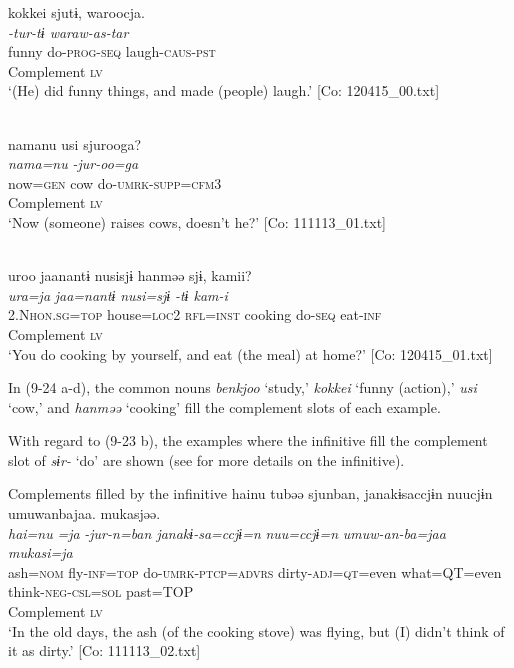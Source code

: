 \ex %
\gllll   {\textbar}kokkei{\textbar}  sjutɨ,  waroocja.\\
      \textit{}  \textit{-tur-tɨ  waraw-as-tar}\\
      funny  do-\textsc{prog}-\textsc{seq}  laugh-\textsc{caus}-\textsc{pst}\\
      Complement  \textsc{lv}  \\
      \glt       ‘(He) did funny things, and made (people) laugh.’ [Co: 120415\_00.txt]

\ex\relax  [= (8-61 a)]\\
    \gllll  namanu  usi  sjurooga?\\
      \textit{nama=nu}  \textit{}  \textit{-jur-oo=ga}\\
      now=\textsc{gen}  cow  do-\textsc{umrk}-\textsc{supp}=\textsc{cfm}3\\
        Complement  \textsc{lv}\\
      \glt       ‘Now (someone) raises cows, doesn’t he?’ [Co: 111113\_01.txt]

\ex\relax [= (6-65 b)]\\
    \gllll  uroo  jaanantɨ  nusisjɨ  hanməə  sjɨ,  kamii?\\
      \textit{ura=ja}  \textit{jaa=nantɨ}  \textit{nusi=sjɨ}  \textit{}  \textit{-tɨ  kam-i}\\
      2.N\textsc{hon}.\textsc{sg}=\textsc{top}  house=\textsc{loc}2  \textsc{rfl}=\textsc{inst}  cooking  do-\textsc{seq}  eat-\textsc{inf}\\
            Complement  \textsc{lv}  \\
      \glt       ‘You do cooking by yourself, and eat (the meal) at home?’ [Co: 120415\_01.txt]
    \z
\z

In (9-24 a-d), the common nouns \textit{benkjoo} ‘study,’ \textit{kokkei} ‘funny (action),’ \textit{usi} ‘cow,’ and \textit{hanməə} ‘cooking’ fill the complement slots of each example.

With regard to (9-23 b), the examples where the infinitive fill the complement slot of \textit{sɨr-} ‘do’ are shown (see  for more details on the infinitive).

\ea   Complements filled by the infinitive \label{ex:9.25}
\ea \label{ex:9.25a}%
 \gllll  hainu  tubəə  sjunban,  janakɨsaccjɨn  nuucjɨn  umuwanbajaa.  mukasjəə.\\
      \textit{hai=nu}  \textit{=ja}  \textit{-jur-n=ban  janakɨ-sa=ccjɨ=n}    \textit{nuu=ccjɨ=n}  \textit{umuw-an-ba=jaa}  \textit{mukasi=ja}\\
      ash=\textsc{nom}  fly-\textsc{inf}=\textsc{top}  do-\textsc{umrk}-\textsc{ptcp}=\textsc{advrs}  dirty-\textsc{adj}=\textsc{qt}=even  what=QT=even  think-\textsc{neg}-\textsc{csl}=\textsc{sol}  past=TOP\\
        Complement  \textsc{lv}      \\
    \glt       ‘In the old days, the ash (of the cooking stove) was flying, but (I) didn’t think of it as dirty.’ [Co: 111113\_02.txt]

